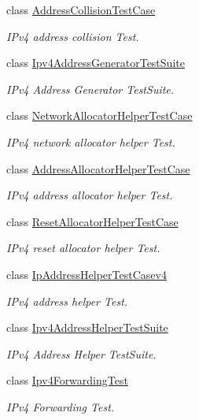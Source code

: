 \begin{DoxyCompactItemize}
class \hyperlink{classAddressCollisionTestCase}{Address\+Collision\+Test\+Case}
\begin{DoxyCompactList}\small\item\em I\+Pv4 address collision Test. \end{DoxyCompactList}\item 
class \hyperlink{classIpv4AddressGeneratorTestSuite}{Ipv4\+Address\+Generator\+Test\+Suite}
\begin{DoxyCompactList}\small\item\em I\+Pv4 Address Generator Test\+Suite. \end{DoxyCompactList}\item 
class \hyperlink{classNetworkAllocatorHelperTestCase}{Network\+Allocator\+Helper\+Test\+Case}
\begin{DoxyCompactList}\small\item\em I\+Pv4 network allocator helper Test. \end{DoxyCompactList}\item 
class \hyperlink{classAddressAllocatorHelperTestCase}{Address\+Allocator\+Helper\+Test\+Case}
\begin{DoxyCompactList}\small\item\em I\+Pv4 address allocator helper Test. \end{DoxyCompactList}\item 
class \hyperlink{classResetAllocatorHelperTestCase}{Reset\+Allocator\+Helper\+Test\+Case}
\begin{DoxyCompactList}\small\item\em I\+Pv4 reset allocator helper Test. \end{DoxyCompactList}\item 
class \hyperlink{classIpAddressHelperTestCasev4}{Ip\+Address\+Helper\+Test\+Casev4}
\begin{DoxyCompactList}\small\item\em I\+Pv4 address helper Test. \end{DoxyCompactList}\item 
class \hyperlink{classIpv4AddressHelperTestSuite}{Ipv4\+Address\+Helper\+Test\+Suite}
\begin{DoxyCompactList}\small\item\em I\+Pv4 Address Helper Test\+Suite. \end{DoxyCompactList}\item 
class \hyperlink{classIpv4ForwardingTest}{Ipv4\+Forwarding\+Test}
\begin{DoxyCompactList}\small\item\em I\+Pv4 Forwarding Test. \end{DoxyCompactList}\item 

\end{DoxyCompactItemize}

